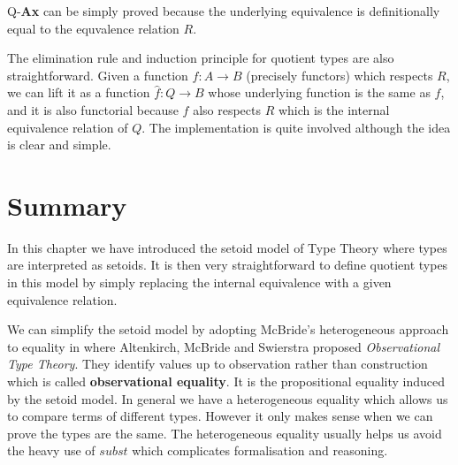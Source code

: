 Q-\textbf{Ax} can be simply proved because the underlying equivalence is definitionally equal to the equvalence relation $R$.

The elimination rule and induction principle for quotient types are also straightforward. Given a function $f : A \to B$ (precisely functors) which respects $R$, we can lift it as a function  $\hat{f} : Q \to B$ whose underlying function is the same as $f$, and it is also functorial because $f$ also respects $R$ which is the internal equivalence relation of $Q$.
The implementation is quite involved although the idea is clear and simple.

\section{Summary}

In this chapter we have introduced the setoid model of Type Theory where types are interpreted as setoids. It is then very straightforward to define quotient types in this model by simply replacing the internal equivalence with a given equivalence relation. 

We can simplify the setoid model by adopting McBride's heterogeneous
approach to equality in \cite{alti:ott-conf} where Altenkirch, McBride and Swierstra
 proposed \emph{Observational Type Theory}. They identify values up to observation rather than construction which is called \textbf{observational equality}. It is the propositional equality induced by the setoid model.  In general we have a heterogeneous equality which allows us to compare terms of different types. However it only makes sense when we can prove the types are the same.
The heterogeneous equality usually helps us avoid the heavy use of $subst$ which complicates formalisation and reasoning. 












